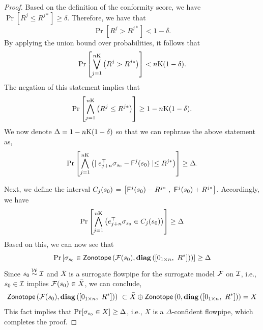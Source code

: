 \begin{proof}
Based on the definition of the conformity score, we have $\Pr\left[ R^j \leq R^{j*} \right] \geq \delta$. Therefore, we have that
$$
\Pr[R^j > R^{j*}] < 1-\delta.
$$
By applying the union bound over probabilities, it follows that
$$
\Pr\left[  \bigvee_{j=1}^{n\mathrm{K}} \left(R^j > R^{j*} \right) \right] <  n\mathrm{K}(1-\delta).
$$
The negation of this statement implies that
\begin{equation}\label{eq:0}
\Pr\left[  \bigwedge_{j=1}^{n\mathrm{K}} \left(R^j \leq R^{j*} \right) \right] \geq  1-n\mathrm{K}(1-\delta).
\end{equation}
We now denote $\Delta= 1-n\mathrm{K}(1-\delta)$ so that we can rephrase the above statement as, 
$$
\Pr\left[  \bigwedge_{j=1}^{n\mathrm{K}} \left( \mid e_{j+n}^\top \sigma_{s_0} - \mathsf{F}^j(s_0) \mid \leq  R^{j*}\right) \right] \geq  \Delta.
$$

Next, we define the interval $C_j(s_0)$ = $\left[ \mathsf{F}^j(\state_0)  -R^{j*}\ ,\  \mathsf{F}^j(\state_0)  +  R^{j*} \right]$. Accordingly,  we have
$$
\Pr\left[  \bigwedge_{j=1}^{n\mathrm{K}} \left( e_{j+n}^\top \sigma_{s_0} \in C_j(s_0) \right) \right]  \geq  \Delta
$$
Based on this, we can now see that
\begin{equation} \label{eq:1}
\Pr\left[  \sigma_{s_0} \in \mathsf{Zonotope}\left(\mathcal{F}(s_0) , \mathbf{diag}\left([0_{1\times n},\ R^*]\right)\right) \right]\geq \Delta
\end{equation}
Since $s_0 \stackrel{\mathcal{W}}{\sim} \mathcal{I}$ and $\bar{X}$ is a surrogate flowpipe for the surrogate model $\mathcal{F}$ on $\mathcal{I}$, i.e., $s_0 \in \mathcal{I}$ implies $\mathcal{F}(s_0) \in \bar{X}$, we can conclude,
\begin{equation}\label{eq:2}
\zon\left(\overallf(\state_0) , \mathbf{diag}\left([0_{1\times n},\ R^*]\right)\right)\ 
 \subset \bar{X} \oplus \zon\left(0 , \mathbf{diag}\left([0_{1\times n},\ R^*]\right)\right) = X
\end{equation}
This fact implies that $\Pr[\sigma_{s_0} \in X  ] \geq \Delta$, i.e., $X$ is a $\Delta$-confident flowpipe, which completes the proof.
\end{proof}

